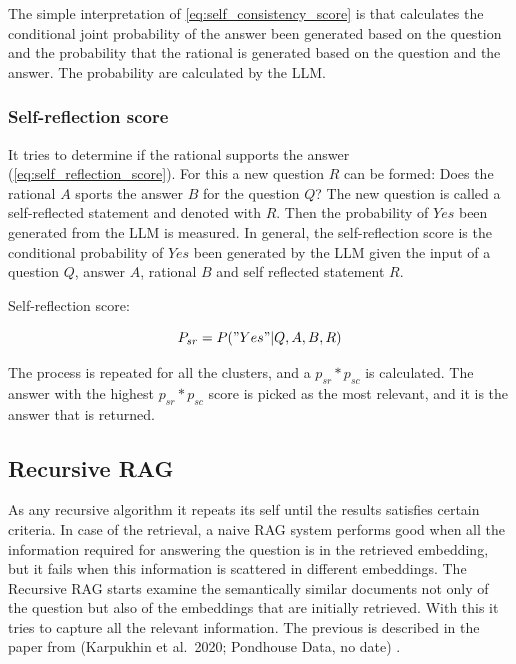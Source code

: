 \documentclass{wseas}
\begin{document}
The simple interpretation of \autoref{eq:self_consistency_score} is that
calculates the conditional joint probability of the answer been generated based on the question 
and the probability that the rational is generated based on the question and the
answer. The probability are calculated by the LLM. 

\subsubsection{Self-reflection score}

It tries to determine if the rational supports the answer (\autoref{eq:self_reflection_score}). For this a new
question $R$ can be formed: Does the rational $A$ sports the answer
$B$ for the question $Q$? The new question is called a
self-reflected statement and denoted with $R$. Then the probability of $Yes$
been generated from the LLM is measured. In general, the self-reflection
score is the conditional probability of $Yes$ been generated by the
LLM given the input of a question $Q$, answer $A$, rational $B$ and self
reflected statement $R$.

Self-reflection score: 

\begin{equation}
  P_{sr} = P("Yes"|Q, A, B, R)
  \label{eq:self_reflection_score}  
\end{equation}

The process is repeated for all the clusters, and a \(p_{sr}*p_{sc}\) is
calculated. The answer with the highest \(p_{sr}*p_{sc}\) score is
picked as the most relevant, and it is the answer that is returned.

\subsection{Recursive RAG}

As any recursive algorithm it repeats its self until the results
satisfies certain criteria. In case of the retrieval, a naive RAG system
performs good when all the information required for answering the
question is in the retrieved embedding, but it fails when this
information is scattered in different embeddings. The Recursive RAG
starts examine the semantically similar documents not only of the
question but also of the embeddings that are initially retrieved. With
this it tries to capture all the relevant information. The previous is
described in the paper from (Karpukhin et al.~2020; Pondhouse Data, no
date) \cite{website_PondhouseGuideOnAdvancedRAG} .
\end{document}
